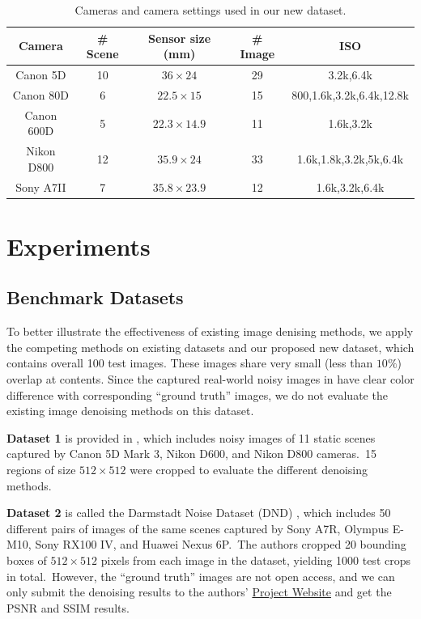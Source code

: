 \begin{table}[t!]
\caption{Cameras and camera settings used in our new dataset.}
\label{tab6-4}
\begin{center}
\small
\renewcommand\arraystretch{1.2}
\begin{tabular*}{1\textwidth}{@{\extracolsep{\fill}}ccccc}
\hline
Camera
&
\# Scene
&
Sensor size (mm)
&
\# Image
&
ISO
\\
\hline
Canon 5D & 10  & $36\times24$  & 29  & 3.2k,6.4k
\\
\hline
Canon 80D & 6  & $22.5\times15$  & 15 & 800,1.6k,3.2k,6.4k,12.8k 
\\
\hline   
Canon 600D & 5 & $22.3\times14.9$  & 11  & 1.6k,3.2k 
\\
\hline   
Nikon D800 & 12 & $35.9\times24$  & 33 & 1.6k,1.8k,3.2k,5k,6.4k 
\\
\hline   
Sony A7II & 7 & $35.8\times23.9$  & 12  & 1.6k,3.2k,6.4k 
\\
\hline
\end{tabular*}
\end{center}
\vspace{-5mm}
\end{table}

\section{Experiments}

\subsection{Benchmark Datasets} 

To better illustrate the effectiveness of existing image denising methods, we apply the competing methods on existing datasets \cite{crosschannel2016,dnd2017} and our proposed new dataset, which contains overall 100 test images. These images share very small (less than $10\%$) overlap at contents. Since the captured real-world noisy images in \cite{RENOIR2014} have clear color difference with corresponding ``ground truth'' images, we do not evaluate the existing image denoising methods on this dataset.

\textbf{Dataset 1} is provided in \cite{crosschannel2016}, which includes noisy images of 11 static scenes captured by Canon 5D Mark 3, Nikon D600, and Nikon D800 cameras.\ 15 regions of size $512\times512$ were cropped to evaluate the different denoising methods.  

\textbf{Dataset 2} is called the Darmstadt Noise Dataset (DND) \cite{dnd2017}, which includes 50 different pairs of images of the same scenes captured by Sony A7R, Olympus E-M10, Sony RX100 IV, and Huawei Nexus 6P.\ The authors cropped 20 bounding boxes of $512\times512$ pixels from each image in the dataset, yielding 1000 test crops in total.\ However, the ``ground truth'' images are not open access, and we can only submit the denoising results to the authors' \href{https://noise.visinf.tu-darmstadt.de/}{Project Website} and get the PSNR and SSIM \cite{ssim} results.

